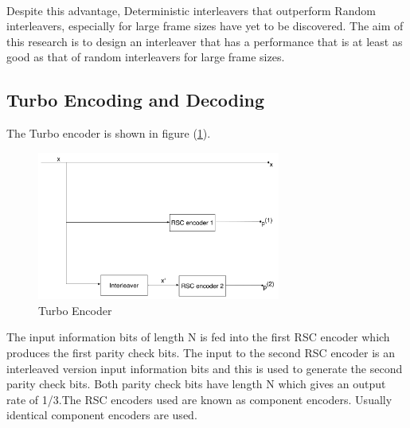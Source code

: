 \documentclass[20 pts]{article}
\begin{document}
\paragraph{}
Despite this advantage, Deterministic interleavers that outperform Random interleavers,
 especially for large frame sizes have yet to be discovered. The aim of this research is
  to design an interleaver that has a performance that is at least as good as that of random 
  interleavers for large frame sizes. 

\subsection{Turbo Encoding and Decoding}
The Turbo encoder is shown in figure (\ref{TC}).

\begin{center}
\begin{figure}[h!]
\includegraphics[width=8cm]{TurboEncoder.pdf}
\caption{Turbo Encoder}
\label{TC}
\end{figure}
\end{center}

The input information bits of length N is fed into the first RSC encoder which produces the
first parity check bits. The input to the second RSC encoder is an interleaved version 
input information bits and this is used to generate the second parity check bits. Both parity
check bits have length N which gives an output rate of 1/3.The RSC encoders used are known as component encoders. Usually identical component
encoders are used.
\end{document}
